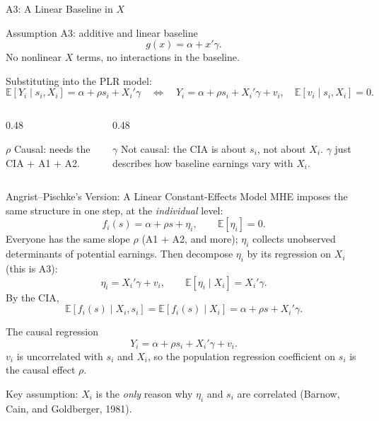 \documentclass[aspectratio=169,11pt]{beamer}
\newcommand{\E}{\mathbb{E}}
\begin{document}
\begin{frame}{A3: A Linear Baseline in $X$}
\small
\begin{block}{Assumption A3: additive and linear baseline}
\[
\boxed{g(x)=\alpha+x'\gamma.}
\]
No nonlinear $X$ terms, no interactions in the baseline.
\end{block}
Substituting into the PLR model:
\[
\boxed{\E[Y_i\mid s_i,X_i]=\alpha+\rho s_i+X_i'\gamma}
\quad\Longleftrightarrow\quad
Y_i=\alpha+\rho s_i+X_i'\gamma+v_i,\quad \E[v_i\mid s_i,X_i]=0.
\]
\medskip
\begin{columns}[T]
\begin{column}{0.48\textwidth}
\begin{block}{$\rho$}
Causal: needs the CIA + A1 + A2.
\end{block}
\end{column}
\begin{column}{0.48\textwidth}
\begin{block}{$\gamma$}
\alert{Not causal}: the CIA is about $s_i$, not about $X_i$. $\gamma$ just describes how baseline earnings vary with $X_i$.
\end{block}
\end{column}
\end{columns}
\end{frame}

\begin{frame}{Angrist--Pischke's Version: A Linear Constant-Effects Model}
\small
MHE imposes the same structure in one step, at the \emph{individual} level:
\[
f_i(s)=\alpha+\rho s+\eta_i,\qquad \E[\eta_i]=0 .
\tag{3.2.7}
\]
Everyone has the same slope $\rho$ (A1 + A2, and more); $\eta_i$ collects unobserved determinants of potential earnings.
Then decompose $\eta_i$ by its regression on $X_i$ (this is A3):
\[
\eta_i=X_i'\gamma+v_i,\qquad \E[\eta_i\mid X_i]=X_i'\gamma .
\]
By the CIA,
\[
\E[f_i(s)\mid X_i,s_i]=\E[f_i(s)\mid X_i]=\alpha+\rho s+X_i'\gamma .
\]
\begin{block}{The causal regression}
\vspace{-0.4em}
\[
Y_i=\alpha+\rho s_i+X_i'\gamma+v_i .
\tag{3.2.9}
\]
$v_i$ is uncorrelated with $s_i$ and $X_i$, so the population regression coefficient on $s_i$ is the causal effect $\rho$.
\end{block}
\alert{Key assumption:} $X_i$ is the \emph{only} reason why $\eta_i$ and $s_i$ are correlated (Barnow, Cain, and Goldberger, 1981).
\end{frame}
\end{document}
